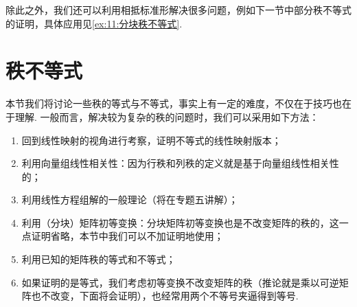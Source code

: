 除此之外，我们还可以利用相抵标准形解决很多问题，例如下一节中部分秩不等式的证明，具体应用见\autoref{ex:11:分块秩不等式}.

\section{秩不等式}

本节我们将讨论一些秩的等式与不等式，事实上有一定的难度，不仅在于技巧也在于理解. 一般而言，解决较为复杂的秩的问题时，我们可以采用如下方法：
\begin{enumerate}
    \item 回到线性映射的视角进行考察，证明不等式的线性映射版本；

    \item 利用向量组线性相关性：因为行秩和列秩的定义就是基于向量组线性相关性的；

    \item 利用线性方程组解的一般理论（将在专题五讲解）；

    \item 利用（分块）矩阵初等变换：分块矩阵初等变换也是不改变矩阵的秩的，这一点证明省略，本节中我们可以不加证明地使用；

    \item 利用已知的矩阵秩的等式和不等式；

    \item 如果证明的是等式，我们考虑初等变换不改变矩阵的秩（推论就是乘以可逆矩阵也不改变，下面将会证明），也经常用两个不等号夹逼得到等号.
\end{enumerate}

